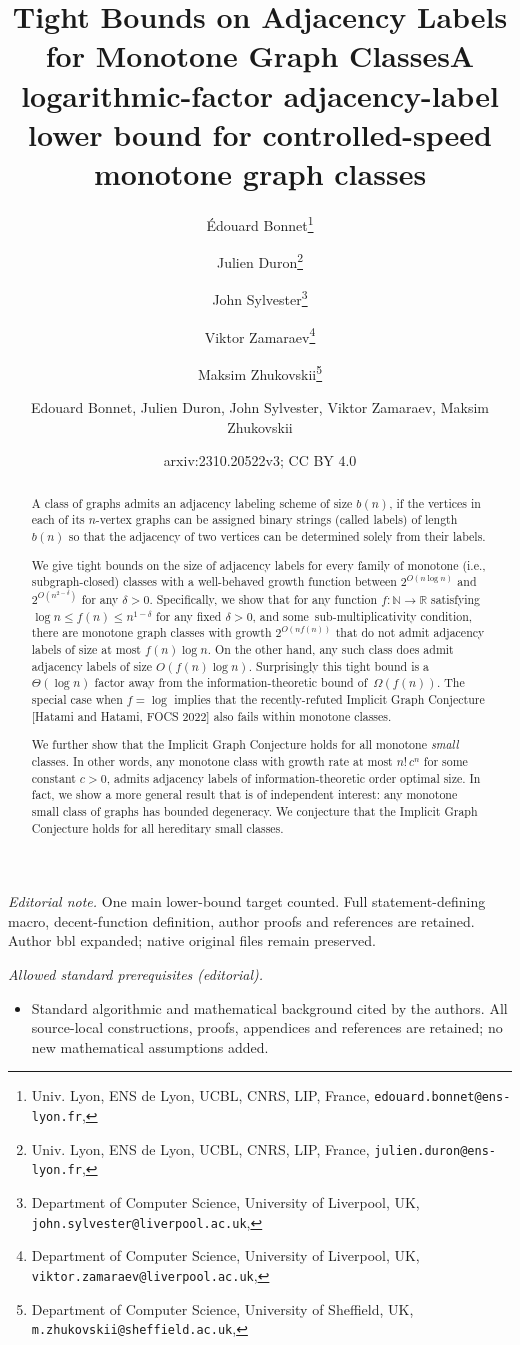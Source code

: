 \documentclass[letterpaper,11pt]{article}
\title{Tight Bounds on Adjacency Labels for Monotone Graph Classes}
\date{}
\author{ }
\author{{\'E}douard Bonnet\thanks{Univ. Lyon, ENS de Lyon, UCBL, CNRS, LIP, France,  \texttt{edouard.bonnet@ens-lyon.fr}, \orcidlink{0000-0002-1653-5822}}    \and Julien Duron\thanks{Univ. Lyon, ENS de Lyon, UCBL, CNRS, LIP, France, \texttt{julien.duron@ens-lyon.fr}, \orcidlink{0009-0004-0925-9438}} \and    John Sylvester\thanks{Department of Computer Science, University of Liverpool, UK, \texttt{john.sylvester@liverpool.ac.uk}, \orcidlink{0000-0002-6543-2934}}
	\and
	Viktor Zamaraev\thanks{Department of Computer Science, University of Liverpool, UK, \texttt{viktor.zamaraev@liverpool.ac.uk}, \orcidlink{0000-0001-5755-4141}}
	\and Maksim Zhukovskii\thanks{Department of Computer Science, University of Sheffield, UK, \texttt{m.zhukovskii@sheffield.ac.uk}, \orcidlink{0000-0001-8763-9533} }}
\title{A logarithmic-factor adjacency-label lower bound for controlled-speed monotone graph classes}
\author{Edouard Bonnet, Julien Duron, John Sylvester, Viktor Zamaraev, Maksim Zhukovskii}
\date{arxiv:2310.20522v3; CC BY 4.0}
\theoremstyle{definition}
\theoremstyle{remark}
\begin{document}
\maketitle
\noindent\textit{Editorial note.} One main lower-bound target counted. Full statement-defining macro, decent-function definition, author proofs and references are retained. Author bbl expanded; native original files remain preserved.\par\medskip
\noindent\textit{Allowed standard prerequisites (editorial).}\begin{itemize}
\item Standard algorithmic and mathematical background cited by the authors. All source-local constructions, proofs, appendices and references are retained; no new mathematical assumptions added.
\end{itemize}\medskip

\begin{abstract}
  A class of graphs admits an adjacency labeling scheme of size $b(n)$, if the vertices in each of its $n$-vertex graphs can be assigned binary strings (called labels) of length $b(n)$ so that the adjacency of two vertices can be determined solely from their labels.
  
  We give tight bounds on the size of adjacency labels for every family of monotone (i.e., subgraph-closed) classes with a well-behaved growth function between $2^{O(n \log n)}$ and $2^{O(n^{2-\delta})}$ for any $\delta > 0$.
  Specifically, we show that for any function $f: \mathbb N \to \mathbb R$ satisfying $\log n \leqslant f(n) \leqslant n^{1-\delta}$ for any fixed $\delta > 0$, and some~sub-multiplicativity condition, there are monotone graph classes with growth $2^{O(nf(n))}$ that do not admit adjacency labels of size at most $f(n) \log n$.
  On the other hand, any such class does admit adjacency labels of size $O(f(n)\log n)$.
  Surprisingly this tight bound is a $\Theta(\log n)$ factor away from the information-theoretic bound of~$\Omega(f(n))$.
  The special case when $f = \log$ implies that the recently-refuted Implicit Graph Conjecture [Hatami and Hatami, FOCS 2022] also fails within monotone classes. 
  
We further show that the Implicit Graph Conjecture holds for all monotone \emph{small} classes. In other words, any monotone class with growth rate at most $n!\,c^n$ for some constant $c>0$, admits adjacency labels of information-theoretic order optimal size. In fact, we show a more general result that is of independent interest: any monotone small class of graphs has bounded degeneracy.
  We conjecture that the Implicit Graph Conjecture holds for all hereditary small classes.
\end{abstract}
\end{document}
